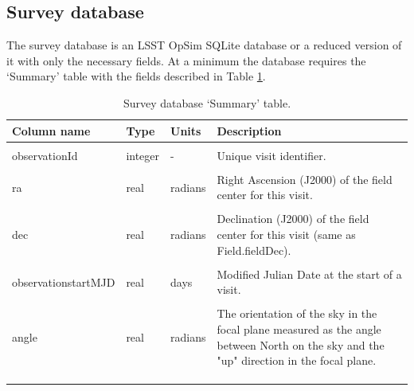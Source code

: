 \documentclass[10pt,a4paper]{article}
\begin{document}
\subsection{Survey database}

The survey database is an LSST OpSim SQLite database or a reduced
version of it with only the necessary fields. At a minimum the database
requires the `Summary' table with the fields described in Table
\ref{tab:sumdesc}.

\begin{longtable}{l l p{20mm} p{50mm}}
    \hline
    Column name                   & Type     & Units   & Description\\
    \hline \hline \\
    observationId                 & integer  & -       & Unique visit identifier. \\ \\
    ra                            & real     & radians & Right Ascension (J2000) of the field center for this visit. \\ \\
    dec                           & real     & radians & Declination (J2000) of the field center for this visit (same as Field.fieldDec).\\ \\
    observationstartMJD           & real     & days    & Modified Julian Date at the start of a visit. \\ \\
    angle                         & real     & radians & The orientation of the sky in the focal plane measured 
                                                         as the angle between North on the sky and the "up" direction 
                                                         in the focal plane. \\ \\
\hline \\


\caption{Survey database `Summary' table.}
\label{tab:sumdesc}                                                                   
\end{longtable}
\end{document}
